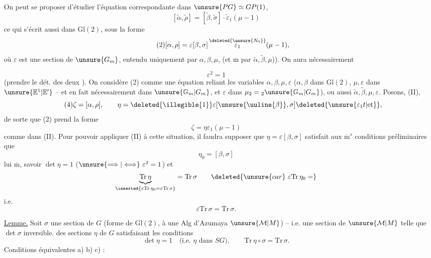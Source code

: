 On peut se proposer d'étudier l'équation correspondante dans
$\unsure{PG}\simeq GP(1)$,
\[
\tag{1}
[\widetilde\alpha,\widetilde\rho]
 =[\widetilde\beta,\widetilde\sigma]\cdot\widetilde\varepsilon_1(\mu-1)
\]
ce qui s'écrit aussi dans $\mathrm{Gl}(2)$, sous la forme 
\[
\tag{2}
[\alpha,\rho]=\varepsilon[\beta,\sigma]\,
\overset{\deleted{\unsure{N_0}}}{\varepsilon_1}(\mu-1),
\]
où $\varepsilon$ est une section de $\unsure{G_m}$,
  entendu uniquement
 par $\alpha,\beta,\mu$,
(et $\overline{\mathrm m}$ par $\widetilde\alpha,\widetilde\beta,\mu$)).
On aura nécessairement


\[
\tag{3}
\varepsilon^2=1
\]
(prendre le dét. des deux ). On considère (2) comme une équation
reliant les variables $\alpha,\beta,\mu,\varepsilon$
($\alpha,\beta$ dans $\mathrm{Gl}(2)$, $\mu,\varepsilon$ dans
$\unsure{\mathbb E^1|\mathbb E'}$ -- et en fait nécessairement dans
$\unsure{\mathbb G_m|G_m}$, et $\varepsilon$  dans
$\mu_2={}_2\unsure{\mathbb G_m|G_m}$), ou aussi
$\widetilde\alpha,\widetilde\beta,\mu,\varepsilon$.
Posons,  (II),
\[
\tag{4}
\zeta=[\alpha,\rho],\qquad
\eta=\deleted{\illegible{1}}\varepsilon
[\unsure{\uuline{\beta}},\sigma]\deleted{\unsure{\varepsilon_1 t|\text{et}}},
\]
de sorte que (2) prend la forme
\[
\tag{5}
\zeta=\eta\varepsilon_1(\mu-1)
\]
comme dans (II). Pour pouvoir appliquer (II) à cette situation, il faudra
supposer que $\eta=\varepsilon[\beta,\sigma]$ satisfait aux
$\overline{\mathrm m}^{s}$ conditions préliminaires que
\[
\eta_0=[\beta,\sigma]
\]
lui $\overline{\mathrm m}$, savoir $\det\eta=1$
($\unsure{\Longrightarrow|\Longleftrightarrow}\ \varepsilon^2=1$) et
\[
\underbrace{\mathrm{Tr}\,\eta}_{\inserted{\varepsilon\mathrm{Tr}\,\eta_0
=\varepsilon\mathrm{Tr}\,\sigma}}
=\mathrm{Tr}\,\sigma
\qquad\deleted{\unsure{car}\ \varepsilon\mathrm{Tr}\,\eta_0=}
\]
i.e.
\[
\varepsilon\mathrm{Tr}\,\sigma=\mathrm{Tr}\,\sigma.
\]


\uline{Lemme.} Soit $\sigma$ une section de $G$ (forme de
$\mathrm{Gl}(2)$,  à une Alg d'Azumaya
$\unsure{\mathcal M|M}$) -- i.e. une section de
$\unsure{\mathcal M|M}$ telle que $\det\sigma$ inversible.
des sections $\eta$  de $G$ satisfaisant les conditions
\[
\det\eta=1\quad\text{(i.e. $\eta$ dans $SG$)},\qquad
\mathrm{Tr}\,\eta\circ\sigma=\mathrm{Tr}\,\sigma.
\]
Conditions équivalentes a) b) c) :

